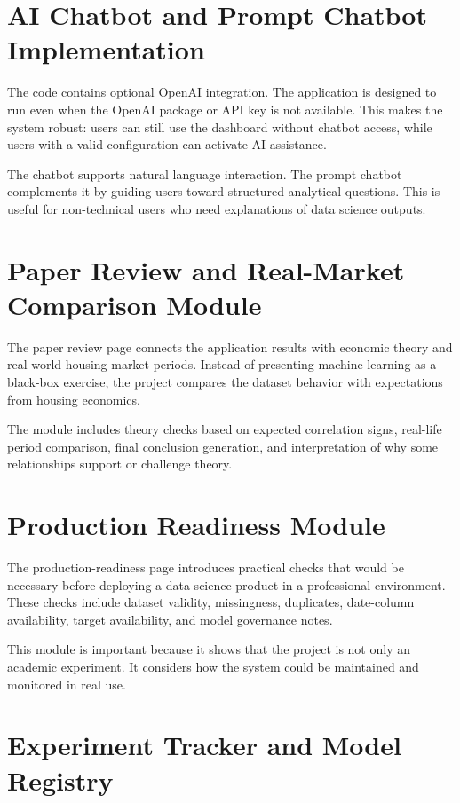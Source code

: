 \section{AI Chatbot and Prompt Chatbot Implementation}

The code contains optional OpenAI integration. The application is designed to run even when the OpenAI package or API key is not available. This makes the system robust: users can still use the dashboard without chatbot access, while users with a valid configuration can activate AI assistance.

The chatbot supports natural language interaction. The prompt chatbot complements it by guiding users toward structured analytical questions. This is useful for non-technical users who need explanations of data science outputs.

\section{Paper Review and Real-Market Comparison Module}

The paper review page connects the application results with economic theory and real-world housing-market periods. Instead of presenting machine learning as a black-box exercise, the project compares the dataset behavior with expectations from housing economics.

The module includes theory checks based on expected correlation signs, real-life period comparison, final conclusion generation, and interpretation of why some relationships support or challenge theory.

\section{Production Readiness Module}

The production-readiness page introduces practical checks that would be necessary before deploying a data science product in a professional environment. These checks include dataset validity, missingness, duplicates, date-column availability, target availability, and model governance notes.

This module is important because it shows that the project is not only an academic experiment. It considers how the system could be maintained and monitored in real use.

\section{Experiment Tracker and Model Registry}

